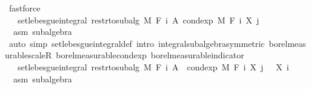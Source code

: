 \begin{isabellebody}
\ fastforce\isanewline
\ \ \ \ \ \ \isamarkupfalse%
\ \isamarkupfalse%
\ {\isachardoublequoteopen}{\isachardot}{\kern0pt}{\isachardot}{\kern0pt}{\isachardot}{\kern0pt}\ {\isacharequal}{\kern0pt}\ set{\isacharunderscore}{\kern0pt}lebesgue{\isacharunderscore}{\kern0pt}integral\ {\isacharparenleft}{\kern0pt}restr{\isacharunderscore}{\kern0pt}to{\isacharunderscore}{\kern0pt}subalg\ M\ {\isacharparenleft}{\kern0pt}F\ i{\isacharparenright}{\kern0pt}{\isacharparenright}{\kern0pt}\ A\ {\isacharparenleft}{\kern0pt}cond{\isacharunderscore}{\kern0pt}exp\ M\ {\isacharparenleft}{\kern0pt}F\ i{\isacharparenright}{\kern0pt}\ {\isacharparenleft}{\kern0pt}X\ j{\isacharparenright}{\kern0pt}{\isacharparenright}{\kern0pt}{\isachardoublequoteclose}\ \isamarkupfalse%
\ {\isacharasterisk}{\kern0pt}\ asm\ subalgebra\ \isamarkupfalse%
\ {\isacharparenleft}{\kern0pt}auto\ simp{\isacharcolon}{\kern0pt}\ set{\isacharunderscore}{\kern0pt}lebesgue{\isacharunderscore}{\kern0pt}integral{\isacharunderscore}{\kern0pt}def\ intro{\isacharbang}{\kern0pt}{\isacharcolon}{\kern0pt}\ integral{\isacharunderscore}{\kern0pt}subalgebra{}{\isacharbrackleft}{\kern0pt}symmetric{\isacharbrackright}{\kern0pt}\ borel{\isacharunderscore}{\kern0pt}measurable{\isacharunderscore}{\kern0pt}scaleR\ borel{\isacharunderscore}{\kern0pt}measurable{\isacharunderscore}{\kern0pt}cond{\isacharunderscore}{\kern0pt}exp\ borel{\isacharunderscore}{\kern0pt}measurable{\isacharunderscore}{\kern0pt}indicator{\isacharparenright}{\kern0pt}\isanewline
\ \ \ \ \ \ \isamarkupfalse%
\ \isamarkupfalse%
\ {\isachardoublequoteopen}{}\ {\isasymle}\ set{\isacharunderscore}{\kern0pt}lebesgue{\isacharunderscore}{\kern0pt}integral\ {\isacharparenleft}{\kern0pt}restr{\isacharunderscore}{\kern0pt}to{\isacharunderscore}{\kern0pt}subalg\ M\ {\isacharparenleft}{\kern0pt}F\ i{\isacharparenright}{\kern0pt}{\isacharparenright}{\kern0pt}\ A\ {\isacharparenleft}{\kern0pt}{\isasymlambda}{\isasymxi}{\isachardot}{\kern0pt}\ cond{\isacharunderscore}{\kern0pt}exp\ M\ {\isacharparenleft}{\kern0pt}F\ i{\isacharparenright}{\kern0pt}\ {\isacharparenleft}{\kern0pt}X\ j{\isacharparenright}{\kern0pt}\ {\isasymxi}\ {\isacharminus}{\kern0pt}\ X\ i\ {\isasymxi}{\isacharparenright}{\kern0pt}{\isachardoublequoteclose}\ \isamarkupfalse%
\ {\isacharasterisk}{\kern0pt}\ asm\ subalgebra\ \isamarkupfalse%

\end{isabellebody}

